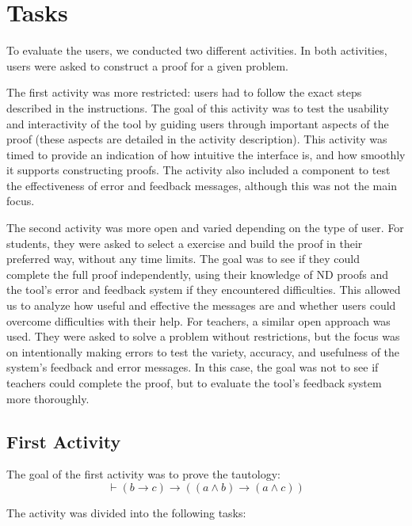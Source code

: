 \section{Tasks}
To evaluate the users, we conducted two different activities. In both activities, users were asked to construct a proof for a given problem.

The first activity was more restricted: users had to follow the exact steps described in the instructions. The goal of this activity was to test the usability and interactivity of the tool by guiding users through important aspects of the proof (these aspects are detailed in the activity description). This activity was timed to provide an indication of how intuitive the interface is, and how smoothly it supports constructing proofs. The activity also included a component to test the effectiveness of error and feedback messages, although this was not the main focus.

The second activity was more open and varied depending on the type of user. For students, they were asked to select a exercise and build the proof in their preferred way, without any time limits. The goal was to see if they could complete the full proof independently, using their knowledge of \gls{ND} proofs and the tool’s error and feedback system if they encountered difficulties. This allowed us to analyze how useful and effective the messages are and whether users could overcome difficulties with their help. For teachers, a similar open approach was used. They were asked to solve a problem without restrictions, but the focus was on intentionally making errors to test the variety, accuracy, and usefulness of the system’s feedback and error messages. In this case, the goal was not to see if teachers could complete the proof, but to evaluate the tool’s feedback system more thoroughly.

\subsection*{First Activity}
The goal of the first activity was to prove the tautology:
\[
\vdash (b \rightarrow c) \rightarrow ((a \wedge b) \rightarrow (a \wedge c))
\]

The activity was divided into the following tasks:

